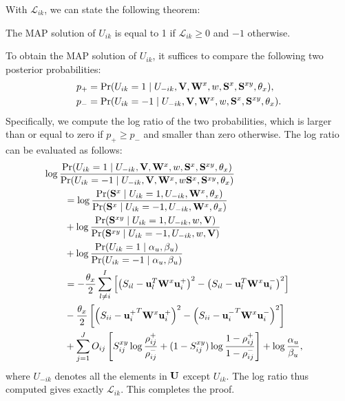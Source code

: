 With $ \mathcal{L}_{ik} $, we can state the following theorem: %
\begin{mythe}
The \mbox{MAP} solution of $ U_{ik} $ is equal to 1 if $ \mathcal{L}_{ik}\ge 0 $ and $-1$ otherwise.
\label{theorem:updateu}\end{mythe}
\begin{myproof}
To obtain the \mbox{MAP} solution of $ U_{ik} $, it suffices to compare the following two posterior probabilities:
\begin{align}
p_{+} &= \Pr(U_{ik}=1\mid U_{-ik},{\bf V} , {\bf W}^{x}, w,{\bf S}^{x}, {\bf S}^{xy},\theta_{x}),\nonumber\\
p_{-} &= \Pr(U_{ik}=-1 \mid U_{-ik},{\bf V} , {\bf W}^{x}, w,{\bf S}^{x}, {\bf S}^{xy},\theta_{x}).\nonumber
\end{align}
Specifically, we compute the log ratio of the two probabilities, which is larger than or equal to zero if $ p_{+} \ge p_{-} $ and smaller than zero otherwise. The log ratio can be evaluated as follows:
\begin{align}
\lefteqn{\log \frac{\Pr(U_{ik} = 1\mid U_{-ik},\V , \W^{x}, w,\S^{x}, \S^{xy},\theta_{x})}{\Pr(U_{ik} = -1\mid U_{-ik},\V , \W^{x}, w \S^{x}, \S^{xy},\theta_{x})}}\nonumber\\ & \ \ \ \ \ \ 
= \log \frac{\Pr(\S^{x}\mid U_{ik}=1, U_{-ik}, \W^{x},\theta_{x})}{\Pr(\S^{x}\mid U_{ik}=-1, U_{-ik}, \W^{x},\theta_{x})}\nonumber\\ & \ \ \ \ \ \ 
+\log \frac{\Pr(\S^{xy}\mid U_{ik}=1, U_{-ik}, w,\V)}{\Pr(\S^{xy}\mid U_{ik}=-1, U_{-ik}, w,\V)}\nonumber\\& \ \ \ \ \ \ 
+ \log \frac{\Pr(U_{ik} = 1\mid \alpha_{u},\beta_{u})}{\Pr(U_{ik} = -1\mid \alpha_{u},\beta_{u})}
\nonumber\\ & \ \ \ \ \ \ 
=-\frac{\theta_{x}}{2}\sum_{l\neq i}^{I}\left[\left(S_{il}-\u_l^T\W^x\u_{i}^{+}\right)^2-\left(S_{il}-\u_l^T\W^x\u_{i}^{-}\right)^2\right]\nonumber\\ & \ \ \ \ \ \ 
-\frac{\theta_{x}}{2}\left[\left(S_{ii}-{\u_{i}^{+}}^T\W^x\u_{i}^{+}\right)^2-\left(S_{ii}-{\u_{i}^{-}}^T\W^x\u_{i}^{-}\right)^2\right]\nonumber\\ & \ \ \ \ \ \ 
+\sum_{j=1}^{J}O_{ij}\left[S_{ij}^{xy}\log \frac{\rho_{ij}^{+}}{\rho_{ij}^{-}} + (1-S_{ij}^{xy})\log \frac{1-\rho_{ij}^{+}}{1-\rho_{ij}^{-}}\right]+\log\frac{\alpha_u}{\beta_u}\nonumber,
\end{align}
where $ U_{-ik} $ denotes all the elements in $ {\bf U} $ except $ U_{ik} $. The log ratio thus computed gives exactly $ \mathcal{L}_{ik} $.  This completes the proof.
\end{myproof}

